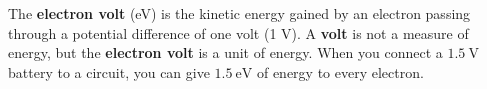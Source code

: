 

\begin{IFact}
{The \textbf{electron volt} (eV) is the kinetic energy gained by an electron  passing through a potential difference of one volt (1 $\mathrm{V}$). A \textbf{volt} is not a measure of energy, but the \textbf{electron volt} is a unit of energy. When you connect a $1.5 ~\mathrm{V}$ battery to a circuit, you can give $1.5~\mathrm{eV}$ of energy to every electron.}
\end{IFact}

